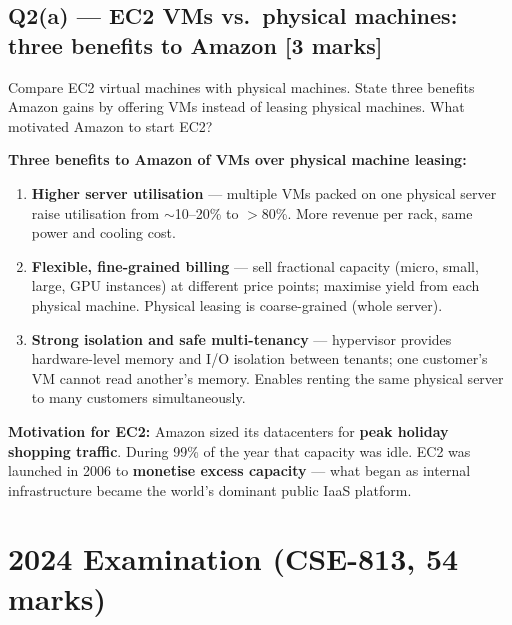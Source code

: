 \documentclass[12pt, a4paper]{article}
\newenvironment{qbox}{\begin{mdframed}[style=qframe]}{\end{mdframed}}
\newenvironment{solbox}{\begin{mdframed}[style=solframe]}{\end{mdframed}}
\newcommand{\qmarks}[1]{\hfill\textbf{\color{orange!70!black}[#1 marks]}}
\begin{document}
\subsection{Q2(a) --- EC2 VMs vs.\ physical machines: three benefits to Amazon
  \texorpdfstring{\qmarks{3}}{}}
\begin{qbox}Compare EC2 virtual machines with physical machines. State three benefits Amazon
gains by offering VMs instead of leasing physical machines. What motivated Amazon to start
EC2?\end{qbox}
\begin{solbox}
\textbf{Three benefits to Amazon of VMs over physical machine leasing:}
\begin{enumerate}[leftmargin=1.6cm, itemsep=3pt]
  \item \textbf{Higher server utilisation} --- multiple VMs packed on one physical server
    raise utilisation from $\sim$10--20\% to $>$80\%. More revenue per rack, same power
    and cooling cost.
  \item \textbf{Flexible, fine-grained billing} --- sell fractional capacity (micro, small,
    large, GPU instances) at different price points; maximise yield from each physical
    machine. Physical leasing is coarse-grained (whole server).
  \item \textbf{Strong isolation and safe multi-tenancy} --- hypervisor provides
    hardware-level memory and I/O isolation between tenants; one customer's VM cannot read
    another's memory. Enables renting the same physical server to many customers
    simultaneously.
\end{enumerate}

\textbf{Motivation for EC2:} Amazon sized its datacenters for \textbf{peak holiday shopping
traffic}. During 99\% of the year that capacity was idle. EC2 was launched in 2006 to
\textbf{monetise excess capacity} --- what began as internal infrastructure became the
world's dominant public IaaS platform.
\end{solbox}

\section{2024 Examination (CSE-813, 54 marks)}

\end{document}
